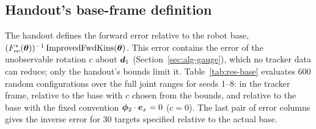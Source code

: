 \documentclass[../main.tex]{subfiles}
\begin{document}
\subsection{Handout's base-frame definition}\label{sec:res-base}
The handout defines the forward error relative to the robot base, $(F^*_{\mathrm{ee}}(\bm{\theta}))^{-1}\operatorname{ImprovedFwdKins}(\bm{\theta})$. This error contains the error of the unobservable rotation $c$ about $\bm{d}_1$ (Section~\ref{sec:alg-gauge}), which no tracker data can reduce; only the handout's bounds limit it. Table~\ref{tab:res-base} evaluates 600 random configurations over the full joint ranges for seeds 1--8: in the tracker frame, relative to the base with $c$ chosen from the bounds, and relative to the base with the fixed convention $\bm{\phi}_2\cdot\bm{e}_x=0$ ($c=0$). The last pair of error columns gives the inverse error for 30 targets specified relative to the actual base.
\end{document}
